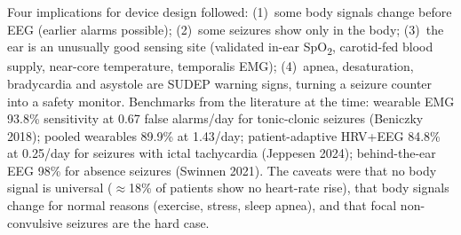 Four implications for device design followed: (1)~some body signals change before EEG (earlier alarms possible); (2)~some seizures show only in the body; (3)~the ear is an unusually good sensing site (validated in-ear SpO\textsubscript{2}, carotid-fed blood supply, near-core temperature, temporalis EMG); (4)~apnea, desaturation, bradycardia and asystole are SUDEP warning signs, turning a seizure counter into a safety monitor. Benchmarks from the literature at the time: wearable EMG 93.8\% sensitivity at 0.67 false alarms/day for tonic-clonic seizures (Beniczky 2018); pooled wearables 89.9\% at 1.43/day; patient-adaptive HRV+EEG 84.8\% at 0.25/day for seizures with ictal tachycardia (Jeppesen 2024); behind-the-ear EEG 98\% for absence seizures (Swinnen 2021). The caveats were that no body signal is universal ($\approx$18\% of patients show no heart-rate rise), that body signals change for normal reasons (exercise, stress, sleep apnea), and that focal non-convulsive seizures are the hard case.
